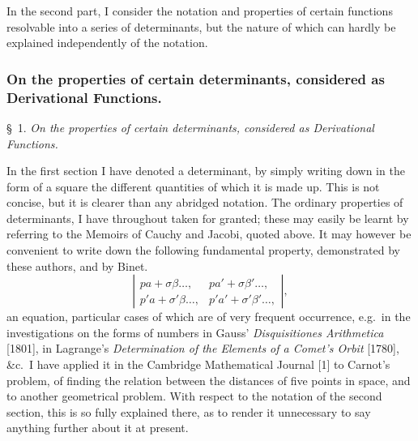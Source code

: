 \documentclass[11pt,a4paper]{article}
\theoremstyle{plain}
\theoremstyle{definition}
\theoremstyle{remark}
\begin{document}
In the second part, I consider the notation and properties of certain functions
resolvable into a series of determinants, but the nature of which can hardly be explained
independently of the notation.

\subsubsection{On the properties of certain determinants, considered as Derivational Functions.}

\textsc{\S\ 1.} \textit{On the properties of certain determinants, considered as Derivational Functions.}

In the first section I have denoted a determinant, by simply writing down in the
form of a square the different quantities of which it is made up. This is not concise,
but it is clearer than any abridged notation. The ordinary properties of determinants,
I have throughout taken for granted; these may easily be learnt by referring to the
Memoirs of Cauchy and Jacobi, quoted above. It may however be convenient to write
down the following fundamental property, demonstrated by these authors, and by Binet.
\[
\left|\begin{array}{cc}
pa + \sigma\beta \ldots, & pa' + \sigma\beta' \ldots, \\
p'a + \sigma'\beta \ldots, & p'a' + \sigma'\beta' \ldots,
\end{array}\right|
\tag{$\Theta$},
\]
an equation, particular cases of which are of very frequent occurrence, e.g.\ in the
investigations on the forms of numbers in Gauss' \textit{Disquisitiones Arithmetica} [1801], in
Lagrange's \textit{Determination of the Elements of a Comet's Orbit} [1780], \&c.\ I have
applied it in the Cambridge Mathematical Journal [1] to Carnot's problem, of finding the relation
between the distances of five points in space, and to another geometrical problem. With
respect to the notation of the second section, this is so fully explained there, as to
render it unnecessary to say anything further about it at present.
\end{document}
